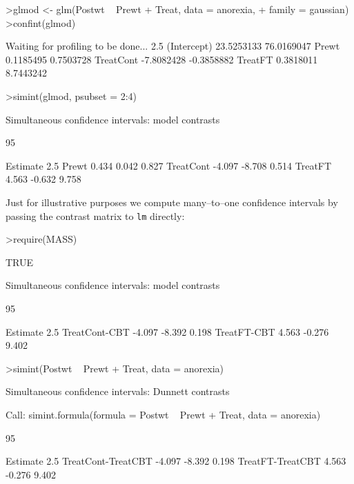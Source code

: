 \documentclass{article}
\begin{document}
\begin{Schunk}
\begin{Sinput}
>glmod <- glm(Postwt ~ Prewt + Treat, data = anorexia, 
+     family = gaussian)
>confint(glmod)
\end{Sinput}
\begin{Soutput}
Waiting for profiling to be done...
                 2.5 %     97.5 %
(Intercept) 23.5253133 76.0169047
Prewt        0.1185495  0.7503728
TreatCont   -7.8082428 -0.3858882
TreatFT      0.3818011  8.7443242
\end{Soutput}
\begin{Sinput}
>simint(glmod, psubset = 2:4)
\end{Sinput}
\begin{Soutput}
	Simultaneous confidence intervals: model contrasts

	95 % confidence intervals

          Estimate  2.5 % 97.5 %
Prewt        0.434  0.042  0.827
TreatCont   -4.097 -8.708  0.514
TreatFT      4.563 -0.632  9.758
\end{Soutput}
\end{Schunk}
\normalsize

Just for illustrative purposes we compute many--to--one confidence intervals
by passing the contrast matrix to \texttt{lm} directly:
\small
\begin{Schunk}
\begin{Sinput}
>require(MASS)
\end{Sinput}
\begin{Soutput}
[1] TRUE
\end{Soutput}
\begin{Soutput}
	Simultaneous confidence intervals: model contrasts

	95 % confidence intervals

              Estimate  2.5 % 97.5 %
TreatCont-CBT   -4.097 -8.392  0.198
TreatFT-CBT      4.563 -0.276  9.402
\end{Soutput}
\begin{Sinput}
>simint(Postwt ~ Prewt + Treat, data = anorexia)
\end{Sinput}
\begin{Soutput}
	Simultaneous confidence intervals: Dunnett
	contrasts

Call: 
simint.formula(formula = Postwt ~ Prewt + Treat, data = anorexia)

	95 % confidence intervals

                   Estimate  2.5 % 97.5 %
TreatCont-TreatCBT   -4.097 -8.392  0.198
TreatFT-TreatCBT      4.563 -0.276  9.402
\end{Soutput}
\end{Schunk}
\normalsize
\end{document}
